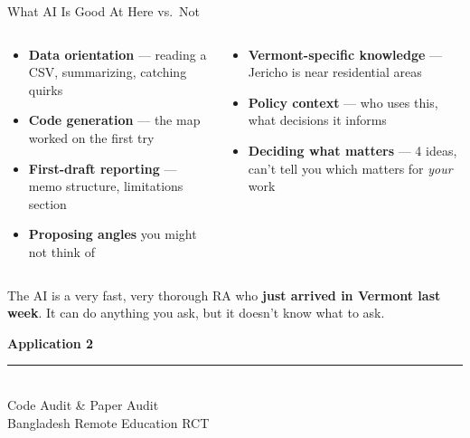 \documentclass[aspectratio=169, 10pt]{beamer}
\begin{document}
\begin{frame}{What AI Is Good At Here vs.\ Not}
\vskip-4pt
\begin{columns}[T]
\begin{column}{0.47\textwidth}
\begin{tcolorbox}[keybox, title={\faCheck\quad AI Strengths}, top=3pt, bottom=3pt]
\small
\begin{itemize}\setlength{\itemsep}{2pt}
  \item \textbf{Data orientation} --- reading a CSV, summarizing, catching quirks
  \item \textbf{Code generation} --- the map worked on the first try
  \item \textbf{First-draft reporting} --- memo structure, limitations section
  \item \textbf{Proposing angles} you might not think of
\end{itemize}
\end{tcolorbox}
\end{column}
\begin{column}{0.47\textwidth}
\begin{tcolorbox}[colback=SoftCoral!8, colframe=SoftCoral, boxrule=0.8pt, arc=3pt,
  left=6pt, right=6pt, top=3pt, bottom=3pt,
  fonttitle=\bfseries\small\color{white}, coltitle=white, colbacktitle=SoftCoral,
  title={\faTimes\quad Still Needs You}]
\small
\begin{itemize}\setlength{\itemsep}{2pt}
  \item \textbf{Vermont-specific knowledge} --- Jericho is near residential areas
  \item \textbf{Policy context} --- who uses this, what decisions it informs
  \item \textbf{Deciding what matters} --- 4 ideas, can't tell you which matters for \textit{your} work
\end{itemize}
\end{tcolorbox}
\end{column}
\end{columns}
\vskip4pt
\begin{tcolorbox}[quotebox, width=12cm]
\small The AI is a very fast, very thorough RA who \textbf{just arrived in Vermont last week}. It can do anything you ask, but it doesn't know what to ask.
\end{tcolorbox}
\end{frame}

{
\begin{frame}
\centering\vfill
{\fontsize{22}{28}\bfseries\selectfont\color{white} Application 2}\\[6pt]
{\color{UVMGold}\rule{5cm}{0.8pt}}\\[6pt]
{\normalsize\color{UVMGold} Code Audit \& Paper Audit}\\[4pt]
{\small\color{PaleSage} Bangladesh Remote Education RCT}
\vfill
\end{frame}
}
\end{document}
